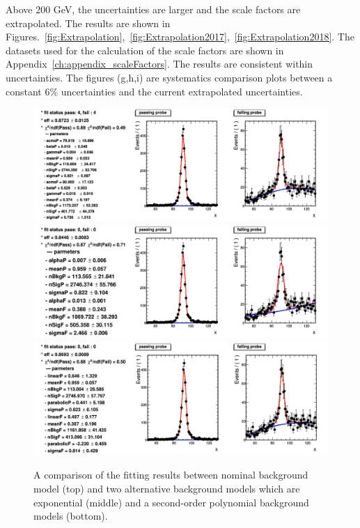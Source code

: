 Above 200 GeV, the uncertainties are larger and the scale factors are extrapolated. The results are shown in Figures.~\ref{fig:Extrapolation},~\ref{fig:Extrapolation2017},~\ref{fig:Extrapolation2018}. The datasets used for the calculation of the scale factors are shown in Appendix~\ref{ch:appendix_scaleFactors}. The results are consistent within uncertainties. The figures (g,h,i) are systematics comparison plots between a constant 6\% uncertainties and the current extrapolated uncertainties.

\begin{figure}[!htbp]
  \centering
  \includegraphics[width=1.0\textwidth]{fig/NominalBkg.png}\\
  \includegraphics[width=1.0\textwidth]{fig/AltBkg_exponential.png}\\
 \includegraphics[width=1.0\textwidth]{fig/AltBkg_Polynomial.png}
  \caption{A comparison of the fitting results between nominal background model (top) and two alternative background models which are exponential (middle) and a second-order polynomial background models (bottom).}
  \label{fig:Sysbkg}
\end{figure}

